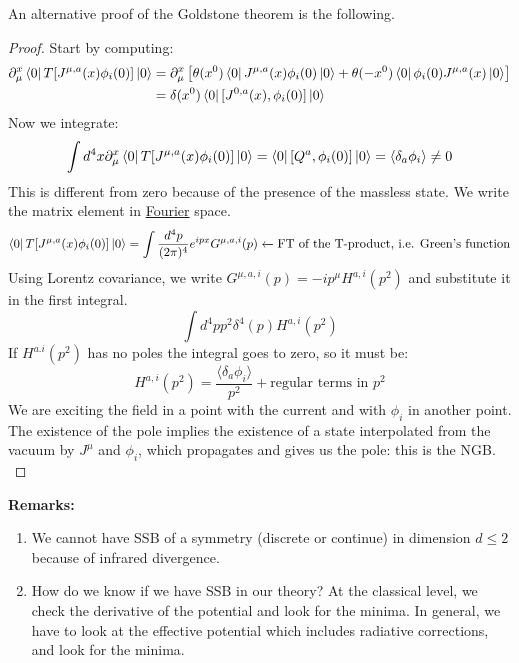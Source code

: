 \documentclass[../main.tex]{subfiles}
\begin{document}
An alternative proof of the Goldstone theorem is the following.
\begin{proof}
Start by computing:
\begin{align*}
\partial_\mu^x\bra{0}T[J^{\mu,a}(x)\phi_i(0)]\ket{0}&=\partial_\mu^x\left[\theta(x^0)\bra{0}J^{\mu,a}(x)\phi_i(0)\ket{0}+\theta(-x^0)\bra{0}\phi_i(0)J^{\mu,a}(x)\ket{0}\right]\\
&=\delta(x^0)\bra{0}[J^{0,a}(x),\phi_i(0)]\ket{0}
\end{align*}
Now we integrate:
\[
\int d^4x\partial_\mu^x\bra{0}T[J^{\mu,a}(x)\phi_i(0)]\ket{0}=\bra{0}[Q^a,\phi_i(0)]\ket{0}=\langle\delta_a\phi_i\rangle\neq0
\]
This is different from zero because of the presence of the massless state. We write the matrix element in \href{https://en.wikipedia.org/wiki/Joseph_Fourier}{Fourier} space.
\[
\bra{0}T[J^{\mu,a}(x)\phi_i(0)]\ket{0}=\int\frac{d^4p}{(2\pi)^4}e^{ipx}G^{\mu,a,i}(p)\xleftarrow[]{}\text{FT of the T-product, i.e. Green's function}
\]
Using Lorentz covariance, we write $G^{\mu,a,i}(p)=-ip^\mu H^{a,i}(p^2)$ and substitute it in the first integral.
\[
\int d^4pp^2\delta^4(p)H^{a,i}(p^2)
\]
If $H^{a.i}(p^2)$ has no poles the integral goes to zero, so it must be:
\[
H^{a,i}(p^2)=\frac{\langle\delta_a\phi_i\rangle}{p^2}+\text{regular terms in $p^2$}
\]
We are exciting the field in a point with the current and with $\phi_i$ in another point. The existence of the pole implies the existence of a state interpolated from the vacuum by $J^\mu$ and $\phi_i$, which propagates and gives us the pole: this is the NGB.\\
\end{proof}
\textbf{Remarks:}
\begin{enumerate}
    \item We cannot have SSB of a symmetry (discrete or continue) in dimension $d\le2$ because of infrared divergence.
    \item How do we know if we have SSB in our theory? At the classical level, we check the derivative of the potential and look for the minima. In general, we have to look at the effective potential which includes radiative corrections, and look for the minima.
\end{enumerate}
\end{document}
